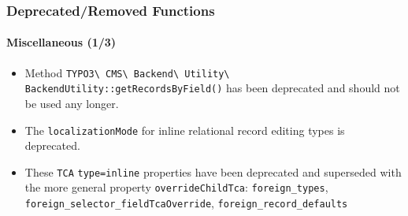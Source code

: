 
\begin{frame}[fragile]
	\frametitle{Deprecated/Removed Functions}
	\framesubtitle{Miscellaneous (1/3)}

	\begin{itemize}

		\item Method
			\texttt{TYPO3\textbackslash
				CMS\textbackslash
				Backend\textbackslash
				Utility\textbackslash
				BackendUtility::\newline getRecordsByField()}
			has been deprecated and should not be used any longer.

		\item The \texttt{localizationMode} for inline relational record editing types is deprecated.

		\item These \texttt{TCA} \texttt{type=inline} properties have been deprecated and superseded
			with the more general property \texttt{overrideChildTca}: \texttt{foreign\_types},
			\texttt{foreign\_selector\_fieldTcaOverride}, \texttt{foreign\_record\_defaults}

	\end{itemize}

\end{frame}



